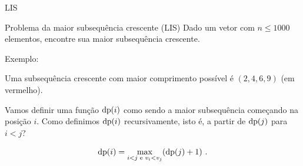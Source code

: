 \begin{frame}{LIS}

    \begin{block}{Problema da maior subsequência crescente (LIS)}
        \footnotesize
        Dado um vetor com $n \leq 1000$ elementos, encontre sua maior subsequência crescente.
    \end{block}

    Exemplo: \pause
    \begin{center}
    \end{center} \pause

    Uma subsequência crescente com maior comprimento possível é $(2, 4, 6, 9)$ (em vermelho).

    Vamos definir uma função $\operatorname{dp}(i)$ como sendo a maior subsequência começando na posição $i$. Como definimos $\operatorname{dp}(i)$ recursivamente, isto é, a partir de $\operatorname{dp}(j)$ para $i < j$?

    \[ \operatorname{dp}(i) = \max_{i < j \text{ e } v_i < v_j}(\operatorname{dp}(j)+1) \ . \]


\end{frame}
